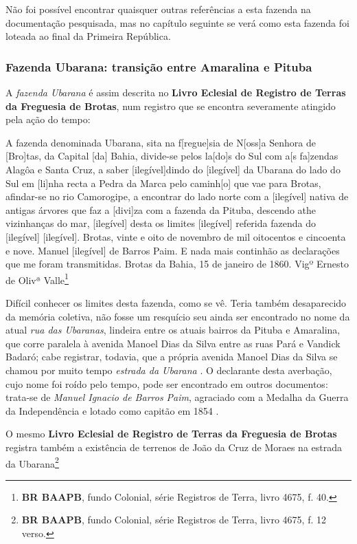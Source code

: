 Não foi possível encontrar quaisquer outras referências a esta fazenda na documentação pesquisada, mas no capítulo seguinte se verá como esta fazenda foi loteada ao final da Primeira República.

\subsubsection{Fazenda Ubarana: transição entre Amaralina e Pituba}

A \textit{fazenda Ubarana} é assim descrita no \textbf{Livro Eclesial de Registro de Terras da Freguesia de Brotas}, num registro que se encontra severamente atingido pela ação do tempo:

\begin{citacao}
A fazenda denominada Ubarana, sita na f[regue]sia de N[oss]a Senhora de [Bro]tas, da Capital [da] Bahia, divide-se pelos la[do]s do Sul com a[s fa]zendas Alagôa e Santa Cruz, a saber [ilegível]dindo do [ilegível] da Ubarana do lado do Sul em [li]nha recta a Pedra da Marca pelo caminh[o] que vae para Brotas, afindar-se no rio Camorogipe, a encontrar do lado norte com a [ilegível] nativa de antigas árvores que faz a [divi]za com a fazenda da Pituba, descendo athe vizinhanças do mar, [ilegível] desta os limites [ilegível] referida fazenda do [ilegível] [ilegível]. Brotas, vinte e oito de novembro de mil oitocentos e cincoenta e nove. Manuel [ilegível] de Barros Paim. E nada mais continhão as declarações que me foram transmitidas. Brotas da Bahia, 15 de janeiro de 1860. Vigº Ernesto de Olivª Valle\footnote{\textbf{BR BAAPB}, fundo Colonial, série Registros de Terra, livro 4675, f. 40.}
\end{citacao}

Difícil conhecer os limites desta fazenda, como se vê. Teria também desaparecido da memória coletiva, não fosse um resquício seu ainda ser encontrado no nome da atual \textit{rua das Ubaranas}, lindeira entre os atuais bairros da Pituba e Amaralina, que corre paralela à avenida Manoel Dias da Silva entre as ruas Pará e Vandick Badaró; cabe registrar, todavia, que a própria avenida Manoel Dias da Silva se chamou por muito tempo \textit{estrada da Ubarana} \cite{souza_guia_1935}. O declarante desta averbação, cujo nome foi roído pelo tempo, pode ser encontrado em outros documentos: trata-se de \textit{Manuel Ignacio de Barros Paim}, agraciado com a Medalha da Guerra da Independência e lotado como capitão em 1854 \cite[p.~172]{masson_almanak_1854}. 

O mesmo \textbf{Livro Eclesial de Registro de Terras da Freguesia de Brotas} registra também a existência de terrenos de João da Cruz de Moraes na estrada da Ubarana\footnote{\textbf{BR BAAPB}, fundo Colonial, série Registros de Terra, livro 4675, f. 12 verso.}

